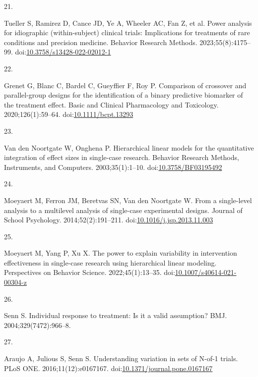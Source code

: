 \documentclass[
  11pt,
]{article}
\newlength{\cslhangindent}
\newlength{\csllabelwidth}
\newenvironment{CSLReferences}[2] %
 {\begin{list}{}{%
  \setlength{\itemindent}{0pt}
  \setlength{\leftmargin}{0pt}
  \setlength{\parsep}{0pt}
  \ifodd #1
   \setlength{\leftmargin}{\cslhangindent}
   \setlength{\itemindent}{-1\cslhangindent}
  \fi
  \setlength{\itemsep}{#2\baselineskip}}}
 {\end{list}}
\newcommand{\CSLLeftMargin}[1]{\parbox[t]{\csllabelwidth}{\strut#1\strut}}
\newcommand{\CSLRightInline}[1]{\parbox[t]{\linewidth - \csllabelwidth}{\strut#1\strut}}
\begin{document}
\begin{CSLReferences}{0}{1}
\CSLLeftMargin{21. }%
\CSLRightInline{Tueller S, Ramirez D, Cance JD, Ye A, Wheeler AC, Fan Z, et al. Power analysis for idiographic (within-subject) clinical trials: Implications for treatments of rare conditions and precision medicine. Behavior Research Methods. 2023;55(8):4175--99. doi:\href{https://doi.org/10.3758/s13428-022-02012-1}{10.3758/s13428-022-02012-1}}

\CSLLeftMargin{22. }%
\CSLRightInline{Grenet G, Blanc C, Bardel C, Gueyffier F, Roy P. Comparison of crossover and parallel-group designs for the identification of a binary predictive biomarker of the treatment effect. Basic and Clinical Pharmacology and Toxicology. 2020;126(1):59--64. doi:\href{https://doi.org/10.1111/bcpt.13293}{10.1111/bcpt.13293}}

\CSLLeftMargin{23. }%
\CSLRightInline{Van den Noortgate W, Onghena P. Hierarchical linear models for the quantitative integration of effect sizes in single-case research. Behavior Research Methods, Instruments, and Computers. 2003;35(1):1--10. doi:\href{https://doi.org/10.3758/BF03195492}{10.3758/BF03195492}}

\CSLLeftMargin{24. }%
\CSLRightInline{Moeyaert M, Ferron JM, Beretvas SN, Van den Noortgate W. From a single-level analysis to a multilevel analysis of single-case experimental designs. Journal of School Psychology. 2014;52(2):191--211. doi:\href{https://doi.org/10.1016/j.jsp.2013.11.003}{10.1016/j.jsp.2013.11.003}}

\CSLLeftMargin{25. }%
\CSLRightInline{Moeyaert M, Yang P, Xu X. The power to explain variability in intervention effectiveness in single-case research using hierarchical linear modeling. Perspectives on Behavior Science. 2022;45(1):13--35. doi:\href{https://doi.org/10.1007/s40614-021-00304-z}{10.1007/s40614-021-00304-z}}

\CSLLeftMargin{26. }%
\CSLRightInline{Senn S. Individual response to treatment: Is it a valid assumption? BMJ. 2004;329(7472):966--8.}

\CSLLeftMargin{27. }%
\CSLRightInline{Araujo A, Julious S, Senn S. Understanding variation in sets of {N}-of-1 trials. PLoS ONE. 2016;11(12):e0167167. doi:\href{https://doi.org/10.1371/journal.pone.0167167}{10.1371/journal.pone.0167167}}


\end{CSLReferences}
\end{document}
